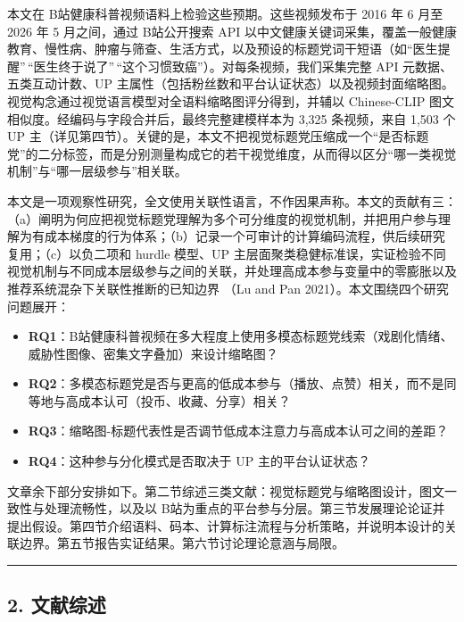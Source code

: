\documentclass[
  fontset=none]{ctexart}
\providecommand{\tightlist}{%
  \setlength{\itemsep}{0pt}\setlength{\parskip}{0pt}}
\begin{document}
本文在 B站健康科普视频语料上检验这些预期。这些视频发布于 2016 年 6 月至 2026 年 5 月之间，通过 B站公开搜索 API 以中文健康关键词采集，覆盖一般健康教育、慢性病、肿瘤与筛查、生活方式，以及预设的标题党词干短语（如``医生提醒''\,``医生终于说了''\,``这个习惯致癌''）。对每条视频，我们采集完整 API 元数据、五类互动计数、UP 主属性（包括粉丝数和平台认证状态）以及视频封面缩略图。视觉构念通过视觉语言模型对全语料缩略图评分得到，并辅以 Chinese-CLIP 图文相似度。经编码与字段合并后，最终完整建模样本为 3,325 条视频，来自 1,503 个 UP 主（详见第四节）。关键的是，本文不把视觉标题党压缩成一个``是否标题党''的二分标签，而是分别测量构成它的若干视觉维度，从而得以区分``哪一类视觉机制''与``哪一层级参与''相关联。

本文是一项观察性研究，全文使用关联性语言，不作因果声称。本文的贡献有三：（a）阐明为何应把视觉标题党理解为多个可分维度的视觉机制，并把用户参与理解为有成本梯度的行为体系；（b）记录一个可审计的计算编码流程，供后续研究复用；（c）以负二项和 hurdle 模型、UP 主层面聚类稳健标准误，实证检验不同视觉机制与不同成本层级参与之间的关联，并处理高成本参与变量中的零膨胀以及推荐系统混杂下关联性推断的已知边界 （Lu and Pan 2021）。本文围绕四个研究问题展开：

\begin{itemize}
\tightlist
\item
  \textbf{RQ1}：B站健康科普视频在多大程度上使用多模态标题党线索（戏剧化情绪、威胁性图像、密集文字叠加）来设计缩略图？
\item
  \textbf{RQ2}：多模态标题党是否与更高的低成本参与（播放、点赞）相关，而不是同等地与高成本认可（投币、收藏、分享）相关？
\item
  \textbf{RQ3}：缩略图-标题代表性是否调节低成本注意力与高成本认可之间的差距？
\item
  \textbf{RQ4}：这种参与分化模式是否取决于 UP 主的平台认证状态？
\end{itemize}

文章余下部分安排如下。第二节综述三类文献：视觉标题党与缩略图设计，图文一致性与处理流畅性，以及以 B站为重点的平台参与分层。第三节发展理论论证并提出假设。第四节介绍语料、码本、计算标注流程与分析策略，并说明本设计的关联边界。第五节报告实证结果。第六节讨论理论意涵与局限。

\begin{center}\rule{0.5\linewidth}{0.5pt}\end{center}

\subsection{2. 文献综述}\label{ux6587ux732eux7efcux8ff0}
\end{document}

